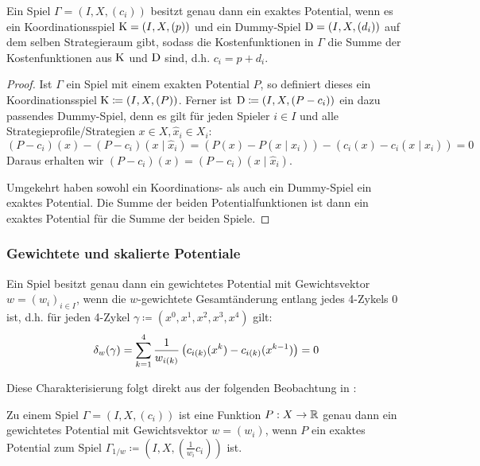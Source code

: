 \begin{satz}\label{satz:CharExPotAlt}
	Ein Spiel $\Gamma = (I, X, (c_i))$ besitzt genau dann ein exaktes Potential, wenn es ein Koordinationsspiel $\mathrm{K} = (I, X, (p))$ und ein Dummy-Spiel $\mathrm{D} = (I, X, (d_i))$ auf dem selben Strategieraum gibt, sodass die Kostenfunktionen in $\Gamma$ die Summe der Kostenfunktionen aus $\mathrm{K}$ und $\mathrm{D}$ sind, d.h. $c_i = p + d_i$.
\end{satz}

\begin{proof}
	Ist $\Gamma$ ein Spiel mit einem exakten Potential $P$, so definiert dieses ein Koordinationsspiel $\mathrm{K} \coloneqq (I, X, (P))$. Ferner ist $\mathrm{D} \coloneqq (I, X, (P-c_i))$ ein dazu passendes Dummy-Spiel, denn es gilt für jeden Spieler $i \in I$ und alle Strategieprofile/Strategien $x \in X, \hat{x}_i \in X_i$:
		\[(P-c_i)(x) - (P-c_i)(x \mid \hat{x}_i) = \left(P(x) - P(x \mid \hat{x}_i)\right) - \left(c_i(x) - c_i(x \mid \hat{x}_i)\right) = 0 \]
	Daraus erhalten wir $(P-c_i)(x) = (P-c_i)(x \mid \hat{x}_i)$.
	
	Umgekehrt haben sowohl ein Koordinations- als auch ein Dummy-Spiel ein exaktes Potential. Die Summe der beiden Potentialfunktionen ist dann ein exaktes Potential für die Summe der beiden Spiele.
\end{proof}


\subsubsection{Gewichtete und skalierte Potentiale}

\begin{satz}\label{satz:CharGewPot}
	Ein Spiel besitzt genau dann ein gewichtetes Potential mit Gewichtsvektor $w = (w_i)_{i \in I}$, wenn die $w$-gewichtete Gesamtänderung entlang jedes 4-Zykels $0$ ist, d.h. für jeden 4-Zykel $\gamma \coloneqq (x^0, x^1, x^2, x^3, x^4)$ gilt:
		\[\delta_w(\gamma) = \sum_{k=1}^4 \frac{1}{w_{i(k)}}\left(c_{i(k)}(x^k) - c_{i(k)}(x^{k-1})\right) = 0\]
\end{satz}

Diese Charakterisierung folgt direkt aus der folgenden Beobachtung in \cite[Kapitel~3.2]{CharExGewPotinWCG}:

\begin{beob}\label{beob:ZshExGewPot}
	Zu einem Spiel $\Gamma = (I, X, (c_i))$ ist eine Funktion $P: X \to \mathbb{R}$ genau dann ein gewichtetes Potential mit Gewichtsvektor $w = (w_i)$, wenn $P$ ein exaktes Potential zum Spiel $\Gamma_{1/w} \coloneqq (I, X, (\frac{1}{w_i}c_i))$ ist.
\end{beob}

